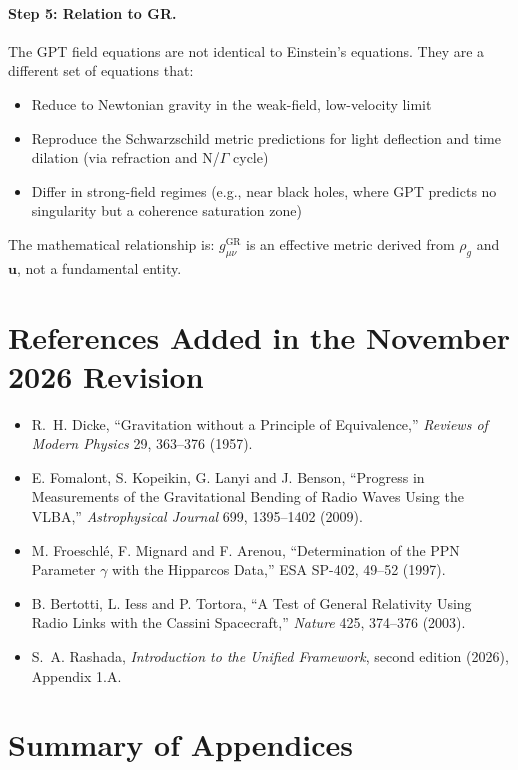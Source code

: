 \documentclass[12pt, a4paper]{article}
\begin{document}
\paragraph{Step 5: Relation to GR.}

The GPT field equations are not identical to Einstein's equations. They are a different set of equations that:
\begin{itemize}
    \item Reduce to Newtonian gravity in the weak-field, low-velocity limit
    \item Reproduce the Schwarzschild metric predictions for light deflection and time dilation (via refraction and N/\(\Gamma\) cycle)
    \item Differ in strong-field regimes (e.g., near black holes, where GPT predicts no singularity but a coherence saturation zone)
\end{itemize}

The mathematical relationship is: \( g_{\mu\nu}^{\text{GR}} \) is an effective metric derived from \( \rho_g \) and \( \mathbf{u} \), not a fundamental entity.

\section*{References Added in the November 2026 Revision}
\begin{itemize}
  \item R.~H. Dicke, ``Gravitation without a Principle of Equivalence,'' \textit{Reviews of Modern Physics} 29, 363--376 (1957).
  \item E. Fomalont, S. Kopeikin, G. Lanyi and J. Benson, ``Progress in Measurements of the Gravitational Bending of Radio Waves Using the VLBA,'' \textit{Astrophysical Journal} 699, 1395--1402 (2009).
  \item M. Froeschl\'e, F. Mignard and F. Arenou, ``Determination of the PPN Parameter \( \gamma \) with the Hipparcos Data,'' ESA SP-402, 49--52 (1997).
  \item B. Bertotti, L. Iess and P. Tortora, ``A Test of General Relativity Using Radio Links with the Cassini Spacecraft,'' \textit{Nature} 425, 374--376 (2003).
  \item S.~A. Rashada, \textit{Introduction to the Unified Framework}, second edition (2026), Appendix 1.A.
\end{itemize}

\section*{Summary of Appendices}
\label{app:summary}
\end{document}
